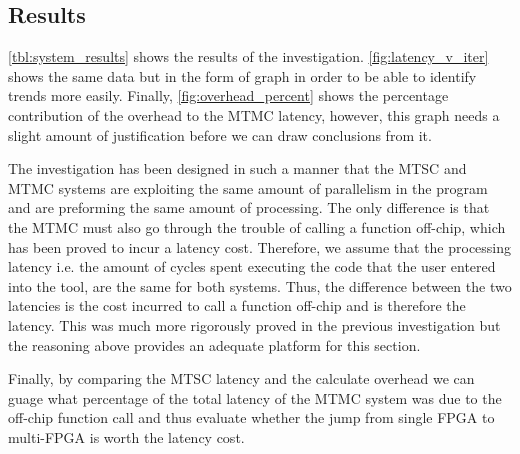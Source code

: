 \subsection{Results}

\autoref{tbl:system_results} shows the results of the investigation. \autoref{fig:latency_v_iter} shows the same data but in the form of graph in order to be able to identify trends more easily.
Finally, \autoref{fig:overhead_percent} shows the percentage contribution of the overhead to the MTMC latency, however, this graph needs a slight amount of justification before we can draw conclusions from it.

The investigation has been designed in such a manner that the MTSC and MTMC systems are exploiting the same amount of parallelism in the program and are preforming the same amount of processing. The only difference is that the MTMC must also go through the trouble of calling a function off-chip, which has been proved to incur a latency cost. Therefore, we assume that the processing latency i.e. the amount of cycles spent executing the code that the user entered into the tool, are the same for both systems. Thus, the difference between the two latencies is the cost incurred to call a function off-chip and is therefore the latency. This was much more rigorously proved in the previous investigation but the reasoning above provides an adequate platform for this section.

Finally, by comparing the MTSC latency and the calculate overhead we can guage what percentage of the total latency of the MTMC system was due to the off-chip function call and thus evaluate whether the jump from single FPGA to multi-FPGA is worth the latency cost. 

